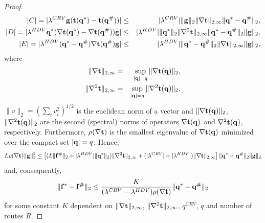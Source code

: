 \documentclass[10pt,a4paper]{amsart}
\begin{document}
\begin{proof}
\begin{eqnarray*}
|C| = |\lambda^{CRV} \bold{g}(\bold{t}(\bold{q}^*) - \bold{t}(\bold{q}^\#))| &\le& |\lambda^{CRV}| \|\bold{g}\|_2 \|\nabla \bold{t}\|_{2,\infty} \|\bold{q}^* - \bold{q}^\#\|_2, \\
|D| = |\lambda^{HDV} \bold{q}^*(\nabla \bold{t}(\bold{q}^*) - \nabla \bold{t}(\bold{q}^\#))\bold{g}| &\le& |\lambda^{HDV}|   \|\bold{q}^*\|_2 \|\nabla^2 \bold{t}\|_{2,\infty} \|\bold{q}^* - \bold{q}^\#\|_2 \|\bold{g}\|_2, \\
|E| = |\lambda^{HDV} (\bold{q}^* - \bold{q}^\#) \nabla \bold{t}(\bold{q}^\#) \bold {g}| &\le& |\lambda^{HDV}| \|\bold{q}^* - \bold{q}^\#\|_2 \|\nabla \bold{t}\|_{2,\infty} \|\bold{g}\|_2, 
\end{eqnarray*}
where 
\begin{eqnarray*}
\|\nabla \bold{t}\|_{2,\infty} &=& \sup_{|\bold{q}| = q} \|\nabla \bold{t(\bold{q})}\|_2,  \\
\|\nabla^2 \bold{t}\|_{2,\infty} &=& \sup_{|\bold{q}| = q} \|\nabla^2 \bold{t(\bold{q})}\|_2,
\end{eqnarray*}
$\|v\|_2 = (\sum_i v_i^2)^{1/2}$ is the euclidean norm of a vector and $\|\nabla \bold{t(\bold{q})}\|_2$, $\|\nabla^2 \bold{t(\bold{q})}\|_2$ are the second (spectral) norms of operators $\nabla \bold{t(\bold{q})}$ and $\nabla^2 \bold{t(\bold{q})}$, respectively. Furthermore, $\rho(\nabla \bold{t})$ is the smallest eigenvalue of $\nabla \bold{t}(\bold{q})$ minimized over the compact set $|\bold{q}| = q$. Hence,
\begin{equation*}
L\rho(\nabla \bold{t}) \|\bold{g}\|_2 ^2 \le 
\left[(L\|\bold{f}^\#\|_2 + |\lambda^{HDV}|\|\bold{q}^*\|_2)\|\nabla^2 \bold{t}\|_{2,\infty} + (|\lambda^{CRV}| + |\lambda^{HDV}|)\|\nabla \bold{t}\|_{2,\infty}\right] \|\bold{q}^* - \bold{q}^\#\|_2 \|\bold{g}\|_2  
\end{equation*}
and, consequently,
\begin{equation}
\label{eq_LipC}
\|\bold{f^*} - \bold{f}^\#\|_2 \le \frac K {(\lambda^{CRV} - \lambda^{HDV})\rho(\nabla \bold{t})} \|\bold{q^*} - \bold{q^\#}\|_2
\end{equation}
for some constant $K$ dependent on $\|\nabla \bold{t}\|_{2,\infty}$, $\|\nabla^2 \bold{t}\|_{2,\infty}$, $q^{CRV}$, $q$ and number of routes $R$.  



\end{proof}
\end{document}

